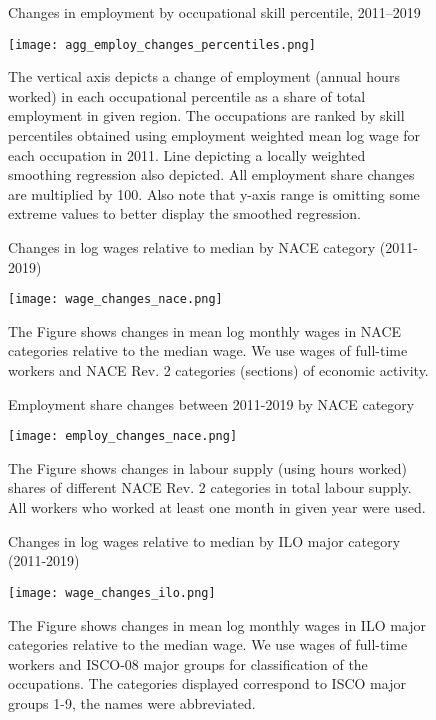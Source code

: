 \documentclass{article}
\begin{document}
\begin{figure}[!htbp]%
    \centering
    \caption{Changes in employment by occupational skill percentile, 2011–2019}
    {\texttt{[image: agg\_employ\_changes\_percentiles.png]} }
    \label{agg_employ_changes_percentiles}
    \caption*{\footnotesize The vertical axis depicts a change of employment (annual hours worked) in each occupational percentile as a share of total employment in given region. The occupations are ranked by skill percentiles obtained using employment weighted mean log wage for each occupation in 2011. Line depicting a locally weighted smoothing regression also depicted. All employment share changes are multiplied by 100. Also note that y-axis range is omitting some extreme values to better display the smoothed regression.   }
\end{figure}


\begin{figure}[!htbp]%
\centering
    \caption{Changes in log wages relative to median by NACE category (2011-2019)}
    {\texttt{[image: wage\_changes\_nace.png]} }
    \caption*{\footnotesize The Figure shows changes in mean log monthly wages in NACE categories relative to the median wage. We use wages of full-time workers and NACE Rev. 2 categories (sections) of economic activity.}
\label{wage_changes_nace}
\end{figure}


\begin{figure}[!htbp]%
\centering
    \caption{Employment share changes between 2011-2019 by NACE category}
    {\texttt{[image: employ\_changes\_nace.png]} }
    \caption*{\footnotesize The Figure shows changes in labour supply (using hours worked) shares of different NACE Rev. 2 categories in total labour supply. All workers who worked at least one month in given year were used.}
\label{employ_changes_nace}
\end{figure}


\begin{figure}[!htbp]%
\centering
    \caption{Changes in log wages relative to median by ILO major category (2011-2019)}
    {\texttt{[image: wage\_changes\_ilo.png]} }
    \caption*{\footnotesize The Figure shows changes in mean log monthly wages in ILO major categories relative to the median wage. We use wages of full-time workers and ISCO-08 major groups for classification of the occupations. The categories displayed correspond to ISCO major groups 1-9, the names were abbreviated.}
\label{wage_changes_ilo}
\end{figure}
\end{document}
